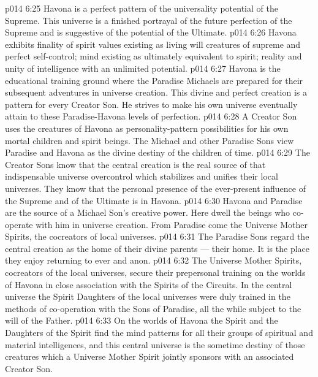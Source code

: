 \vs p014 6:25 Havona is a perfect pattern of the universality potential of the Supreme. This universe is a finished portrayal of the future perfection of the Supreme and is suggestive of the potential of the Ultimate.
\vs p014 6:26 Havona exhibits finality of spirit values existing as living will creatures of supreme and perfect self\hyp{}control; mind existing as ultimately equivalent to spirit; reality and unity of intelligence with an unlimited potential.
\vs p014 6:27 \bibnobreakspace {} Havona is the educational training ground where the Paradise Michaels are prepared for their subsequent adventures in universe creation. This divine and perfect creation is a pattern for every Creator Son. He strives to make his own universe eventually attain to these Paradise\hyp{}Havona levels of perfection.
\vs p014 6:28 A Creator Son uses the creatures of Havona as personality\hyp{}pattern possibilities for his own mortal children and spirit beings. The Michael and other Paradise Sons view Paradise and Havona as the divine destiny of the children of time.
\vs p014 6:29 The Creator Sons know that the central creation is the real source of that indispensable universe overcontrol which stabilizes and unifies their local universes. They know that the personal presence of the ever\hyp{}present influence of the Supreme and of the Ultimate is in Havona.
\vs p014 6:30 Havona and Paradise are the source of a Michael Son’s creative power. Here dwell the beings who co\hyp{}operate with him in universe creation. From Paradise come the Universe Mother Spirits, the cocreators of local universes.
\vs p014 6:31 The Paradise Sons regard the central creation as the home of their divine parents --- their home. It is the place they enjoy returning to ever and anon.
\vs p014 6:32 \bibnobreakspace {} The Universe Mother Spirits, cocreators of the local universes, secure their prepersonal training on the worlds of Havona in close association with the Spirits of the Circuits. In the central universe the Spirit Daughters of the local universes were duly trained in the methods of co\hyp{}operation with the Sons of Paradise, all the while subject to the will of the Father.
\vs p014 6:33 On the worlds of Havona the Spirit and the Daughters of the Spirit find the mind patterns for all their groups of spiritual and material intelligences, and this central universe is the sometime destiny of those creatures which a Universe Mother Spirit jointly sponsors with an associated Creator Son.
